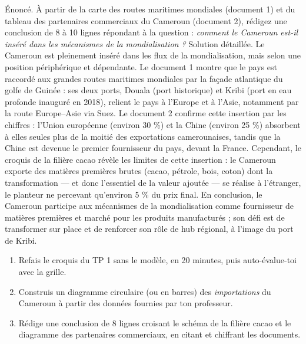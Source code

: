 \documentclass[11pt]{article}
\begin{document}
\begin{exoresolu}
Énoncé. À partir de la carte des routes maritimes mondiales (document 1) et du tableau des partenaires commerciaux du Cameroun (document 2), rédigez une conclusion de 8 à 10 lignes répondant à la question : \emph{comment le Cameroun est-il inséré dans les mécanismes de la mondialisation ?}
\tcblower
Solution détaillée. Le Cameroun est pleinement inséré dans les flux de la mondialisation, mais selon une position périphérique et dépendante. Le document 1 montre que le pays est raccordé aux grandes routes maritimes mondiales par la façade atlantique du golfe de Guinée : ses deux ports, Douala (port historique) et Kribi (port en eau profonde inauguré en 2018), relient le pays à l'Europe et à l'Asie, notamment par la route Europe--Asie via Suez. Le document 2 confirme cette insertion par les chiffres : l'Union européenne (environ 30 \%) et la Chine (environ 25 \%) absorbent à elles seules plus de la moitié des exportations camerounaises, tandis que la Chine est devenue le premier fournisseur du pays, devant la France. Cependant, le croquis de la filière cacao révèle les limites de cette insertion : le Cameroun exporte des matières premières brutes (cacao, pétrole, bois, coton) dont la transformation — et donc l'essentiel de la valeur ajoutée — se réalise à l'étranger, le planteur ne percevant qu'environ 5 \% du prix final. En conclusion, le Cameroun participe aux mécanismes de la mondialisation comme fournisseur de matières premières et marché pour les produits manufacturés ; son défi est de transformer sur place et de renforcer son rôle de hub régional, à l'image du port de Kribi.
\end{exoresolu}

\begin{exercice}
\begin{enumerate}
\item Refais le croquis du TP 1 sans le modèle, en 20 minutes, puis auto-évalue-toi avec la grille.
\item Construis un diagramme circulaire (ou en barres) des \emph{importations} du Cameroun à partir des données fournies par ton professeur.
\item Rédige une conclusion de 8 lignes croisant le schéma de la filière cacao et le diagramme des partenaires commerciaux, en citant et chiffrant les documents.
\end{enumerate}
\end{exercice}
\end{document}
